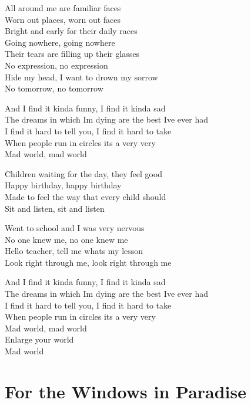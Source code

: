 \documentclass[
  letterpaper,
  a5paper]{memoir}
\begin{document}
All around me are familiar faces\\
Worn out places, worn out faces\\
Bright and early for their daily races\\
Going nowhere, going nowhere\\
Their tears are filling up their glasses\\
No expression, no expression\\
Hide my head, I want to drown my sorrow\\
No tomorrow, no tomorrow

And I find it kinda funny, I find it kinda sad\\
The dreams in which I\textquotesingle m dying are the best
I\textquotesingle ve ever had\\
I find it hard to tell you, I find it hard to take\\
When people run in circles it\textquotesingle s a very very\\
Mad world, mad world

Children waiting for the day, they feel good\\
Happy birthday, happy birthday\\
Made to feel the way that every child should\\
Sit and listen, sit and listen

Went to school and I was very nervous\\
No one knew me, no one knew me\\
Hello teacher, tell me what\textquotesingle s my lesson\\
Look right through me, look right through me

And I find it kinda funny, I find it kinda sad\\
The dreams in which I\textquotesingle m dying are the best
I\textquotesingle ve ever had\\
I find it hard to tell you, I find it hard to take\\
When people run in circles it\textquotesingle s a very very\\
Mad world, mad world\\
Enlarge your world\\
Mad world

\hypertarget{for-the-windows-in-paradise}{%
\chapter{For the Windows in
Paradise}\label{for-the-windows-in-paradise}}
\end{document}
